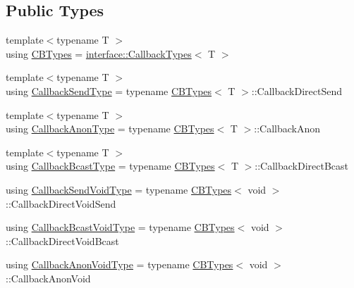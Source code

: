 \subsection*{Public Types}
\begin{DoxyCompactItemize}
\item 
{\footnotesize template$<$typename T $>$ }\\using \hyperlink{structvt_1_1pipe_1_1_pipe_manager_typed_a62dfc4fabe734915f3ec2544e225b6b3}{C\+B\+Types} = \hyperlink{structvt_1_1pipe_1_1interface_1_1_callback_types}{interface\+::\+Callback\+Types}$<$ T $>$
\item 
{\footnotesize template$<$typename T $>$ }\\using \hyperlink{structvt_1_1pipe_1_1_pipe_manager_typed_a306c7c126ed7fb6c5b53bfcf38726291}{Callback\+Send\+Type} = typename \hyperlink{structvt_1_1pipe_1_1_pipe_manager_typed_a62dfc4fabe734915f3ec2544e225b6b3}{C\+B\+Types}$<$ T $>$\+::Callback\+Direct\+Send
\item 
{\footnotesize template$<$typename T $>$ }\\using \hyperlink{structvt_1_1pipe_1_1_pipe_manager_typed_a3723a2c74fb38e4ad6d7aa546e720ae8}{Callback\+Anon\+Type} = typename \hyperlink{structvt_1_1pipe_1_1_pipe_manager_typed_a62dfc4fabe734915f3ec2544e225b6b3}{C\+B\+Types}$<$ T $>$\+::Callback\+Anon
\item 
{\footnotesize template$<$typename T $>$ }\\using \hyperlink{structvt_1_1pipe_1_1_pipe_manager_typed_a4176395e8a35ec2a809890a9aad5b29e}{Callback\+Bcast\+Type} = typename \hyperlink{structvt_1_1pipe_1_1_pipe_manager_typed_a62dfc4fabe734915f3ec2544e225b6b3}{C\+B\+Types}$<$ T $>$\+::Callback\+Direct\+Bcast
\item 
using \hyperlink{structvt_1_1pipe_1_1_pipe_manager_typed_a09eb51f50878116c3b0867fad5f9aab0}{Callback\+Send\+Void\+Type} = typename \hyperlink{structvt_1_1pipe_1_1_pipe_manager_typed_a62dfc4fabe734915f3ec2544e225b6b3}{C\+B\+Types}$<$ void $>$\+::Callback\+Direct\+Void\+Send
\item 
using \hyperlink{structvt_1_1pipe_1_1_pipe_manager_typed_ab028a342e37daeacc38acbfc185e0997}{Callback\+Bcast\+Void\+Type} = typename \hyperlink{structvt_1_1pipe_1_1_pipe_manager_typed_a62dfc4fabe734915f3ec2544e225b6b3}{C\+B\+Types}$<$ void $>$\+::Callback\+Direct\+Void\+Bcast
\item 
using \hyperlink{structvt_1_1pipe_1_1_pipe_manager_typed_ac17133b080980cbe0bc29b285666b2be}{Callback\+Anon\+Void\+Type} = typename \hyperlink{structvt_1_1pipe_1_1_pipe_manager_typed_a62dfc4fabe734915f3ec2544e225b6b3}{C\+B\+Types}$<$ void $>$\+::Callback\+Anon\+Void

\end{DoxyCompactItemize}
